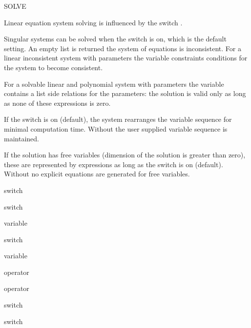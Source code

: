 \begin{Operator}[solve]{SOLVE}
\begin{Comments}
Linear equation system solving is influenced by the switch .

Singular systems can be solved when the switch  is
on, which is the default setting.  An empty list is returned the system of
equations is inconsistent. For a linear inconsistent system with parameters
the variable  constraints
conditions for the system to become consistent.

For a solvable linear and polynomial system with parameters 
the variable 
contains a list side relations for the parameters: the solution is
valid only as long as none of these expressions is zero.

If the switch  is on (default), the system rearranges the 
variable sequence for minimal computation time. Without  
the user supplied variable sequence is maintained.

If the solution has free variables (dimension of the solution is greater
than zero), these are represented by  expressions 
as long as the switch  is on (default). Without
 no explicit equations are generated for free variables.
\end{Comments}

\begin{Related}
\item[\nameref{allbranch} switch]
\item[\nameref{arbvars} switch]
\item[\nameref{assumptions} variable]
\item[\nameref{fullroots} switch]
\item[\nameref{requirements} variable]
\item[\nameref{roots} operator]
\item[\nameref{root\_of} operator]
\item[\nameref{trigform} switch]
\item[\nameref{varopt} switch]
\end{Related}

\end{Operator}

